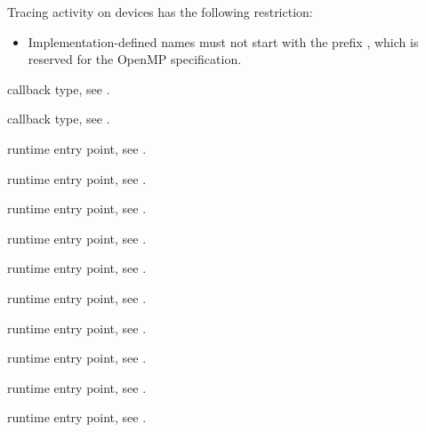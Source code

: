 \restrictions
Tracing activity on devices has the following restriction:

\begin{itemize}
\item Implementation-defined names must not start with the prefix 
      , which is reserved for the OpenMP specification.
\end{itemize}

\begin{crossrefs}
\item {} callback type, 
see .

\item {} callback type, 
see .

\item {} runtime entry point, 
see .

\item {} runtime entry point, see .

\item {} runtime entry point, see .

\item{} runtime entry point, see .

\item {} runtime entry point, see .

\item {} runtime entry point, see .

\item {} runtime entry point, see .

\item {} runtime entry point, see .

\item {} runtime entry point, see .

\item {} runtime entry point, 
see .


\end{crossrefs}
